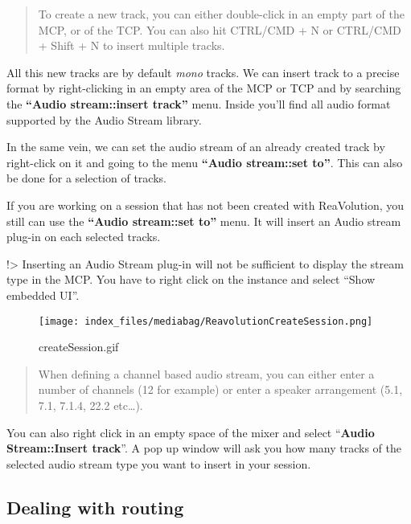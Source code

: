 \documentclass[
  letterpaper,
  DIV=11,
  numbers=noendperiod]{scrreport}
\begin{document}
\begin{quote}
To create a new track, you can either double-click in an empty part of
the MCP, or of the TCP. You can also hit CTRL/CMD + N or CTRL/CMD +
Shift + N to insert multiple tracks.
\end{quote}

All this new tracks are by default \emph{mono} tracks. We can insert
track to a precise format by right-clicking in an empty area of the MCP
or TCP and by searching the \textbf{``Audio stream::insert track''}
menu. Inside you'll find all audio format supported by the Audio Stream
library.

In the same vein, we can set the audio stream of an already created
track by right-click on it and going to the menu \textbf{``Audio
stream::set to''}. This can also be done for a selection of tracks.

If you are working on a session that has not been created with
ReaVolution, you still can use the \textbf{``Audio stream::set to''}
menu. It will insert an Audio stream plug-in on each selected tracks.

!\textgreater{} Inserting an Audio Stream plug-in will not be sufficient
to display the stream type in the MCP. You have to right click on the
instance and select ``Show embedded UI''.

\begin{figure}

{\centering \texttt{[image: index\_files/mediabag/ReavolutionCreateSession.png]}

}

\caption{createSession.gif}

\end{figure}

\begin{quote}
When defining a channel based audio stream, you can either enter a
number of channels (12 for example) or enter a speaker arrangement (5.1,
7.1, 7.1.4, 22.2 etc\ldots).
\end{quote}

You can also right click in an empty space of the mixer and select
``\textbf{Audio Stream::Insert track}''. A pop up window will ask you
how many tracks of the selected audio stream type you want to insert in
your session.

\hypertarget{dealing-with-routing}{%
\subsection{Dealing with routing}\label{dealing-with-routing}}
\end{document}
